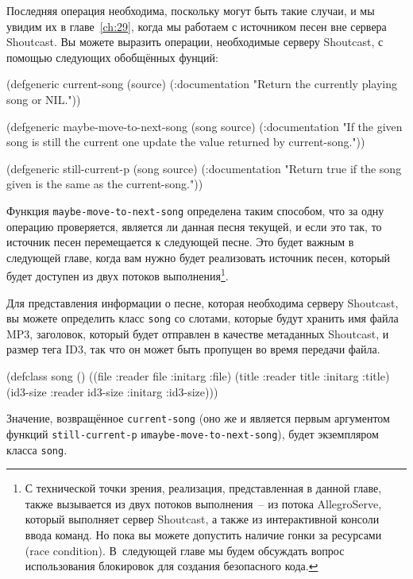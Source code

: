 Последняя операция необходима, поскольку могут быть такие случаи, и мы увидим их в
главе~\ref{ch:29}, когда мы работаем с источником песен вне сервера Shoutcast.  Вы можете
выразить операции, необходимые серверу Shoutcast, с помощью следующих обобщённых фунций:

\begin{myverb}
(defgeneric current-song (source)
  (:documentation "Return the currently playing song or NIL."))

(defgeneric maybe-move-to-next-song (song source)
  (:documentation
   "If the given song is still the current one update the value
returned by current-song."))

(defgeneric still-current-p (song source)
  (:documentation
   "Return true if the song given is the same as the current-song."))
\end{myverb}

Функция \lstinline{maybe-move-to-next-song} определена таким способом, что за одну
операцию проверяется, является ли данная песня текущей, и если это так, то источник песен
перемещается к следующей песне.  Это будет важным в следующей главе, когда вам нужно будет
реализовать источник песен, который будет доступен из двух потоков выполнения\footnote{С
  технической точки зрения, реализация, представленная в данной главе, также вызывается из
  двух потоков выполнения~-- из потока AllegroServe, который выполняет сервер Shoutcast, а
  также из интерактивной консоли ввода команд.  Но пока вы можете допустить наличие гонки
  за ресурсами (race condition).  В~следующей главе мы будем обсуждать вопрос
  использования блокировок для создания безопасного кода.}.

Для представления информации о песне, которая необходима серверу Shoutcast, вы можете
определить класс \lstinline{song} со слотами, которые будут хранить имя файла MP3, заголовок,
который будет отправлен в качестве метаданных Shoutcast, и размер тега ID3, так что он
может быть пропущен во время передачи файла.

\begin{myverb}
(defclass song ()
  ((file     :reader file     :initarg :file)
   (title    :reader title    :initarg :title)
   (id3-size :reader id3-size :initarg :id3-size)))
\end{myverb}

Значение, возвращённое \lstinline{current-song} (оно же и является первым аргументом функций
\lstinline{still-current-p} и\lstinline{maybe-move-to-next-song}), будет экземпляром класса
\lstinline{song}.

